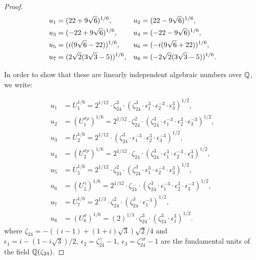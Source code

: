\documentclass[11pt]{amsart}
\begin{document}
\begin{proof}
	\begin{align}
	u_1 & = (22+9 \sqrt{6})^{1/6},&
	u_2 & =   (22-9 \sqrt{6})^{1/6}, \notag \\
	u_3 & =   (-22+9 \sqrt{6})^{1/6}, & 
	u_4 & =   (-22-9 \sqrt{6})^{1/6}, \notag \\
	u_5 & =   (i(9 \sqrt{6}-22))^{1/6}, &
	u_6  &=   (-i(9 \sqrt{6}+22))^{1/6}, \notag \\
	u_7 & = (2 \sqrt{2}(3 \sqrt{3}-5))^{1/6}, &
	u_8 & = (-2 \sqrt{2}(3 \sqrt{3}-5))^{1/6}.\label{U-(1,4)}
\end{align} 

In order to show that these are linearly independent algebraic  numbers over ${\mathbb Q}$, we write:
	
	{\small	\begin{align*}
			u_1 & = U_1^{1/6}=2^{1/12}\cdot \zeta_{24}^3 \cdot \left( \zeta_{24}^3 \cdot \epsilon_1^3 \cdot  \epsilon_2^{-3} \cdot  \epsilon_3^{3}\right)^{1/2}, \\
			u_2 &= (U_1^{\sigma \rho})^{1/6}=2^{1/12}\cdot \zeta_{24}^2 \cdot \left( \zeta_{24}^3 \cdot \epsilon_1^{-3} \cdot  \epsilon_2^{3} \cdot  \epsilon_3^{-3}\right)^{1/2}, \\
			u_3 &= U_2^{1/6}=2^{1/12} \cdot \left( \zeta_{24}^3 \cdot \epsilon_1^{-3} \cdot  \epsilon_2^{3} \cdot  \epsilon_3^{-3}\right)^{1/2}, \\
			u_4 &= (U_2^{\sigma \rho})^{1/6}=2^{1/12}\cdot \zeta_{24} \cdot \left( \zeta_{24}^3 \cdot \epsilon_1^{3} \cdot  \epsilon_2^{-3} \cdot  \epsilon_3^{3}\right)^{1/2}, \\
			u_5 & = U_5^{1/6}=2^{1/12}\cdot \zeta_{24}^2 \cdot \left( \zeta_{24}^3 \cdot \epsilon_1^{3} \cdot  \epsilon_2^{-3} \cdot  \epsilon_3^{3}\right)^{1/2}, \\ 
			u_6 &= (U_5^{ \gamma})^{1/6}=2^{1/12} \cdot \zeta_{24} \cdot \left( \zeta_{24}^3 \cdot \epsilon_1^{-3} \cdot  \epsilon_2^{3} \cdot  \epsilon_3^{-3}\right)^{1/2}, \\
			u_7 &= U_7^{1/6}=2^{1/3}\cdot \zeta_{24}^2 \cdot ( \zeta_{24}^3 \cdot \epsilon_1^{-3})^{1/2}, \\
			u_8 &= (U_6^{\sigma})^{1/6}=(2)^{1/3}\cdot \zeta_{24}^3 \cdot ( \zeta_{24}^3 \cdot \epsilon_1^{3})^{1/2}. 
	\end{align*}}	
	where $ \zeta_{24}= - ((i-1)+(1+i)\sqrt{3})\sqrt{2}/4$ and 
	$\epsilon_1=i-(1- i \sqrt{3})/2, \ \epsilon_2= \zeta_{24}^\gamma -1, \ \epsilon_3=\zeta_{24}^{\gamma \sigma}-1$
	are the fundamental units of the field ${\mathbb Q}(\zeta_{24})$.

\end{proof}
\end{document}
